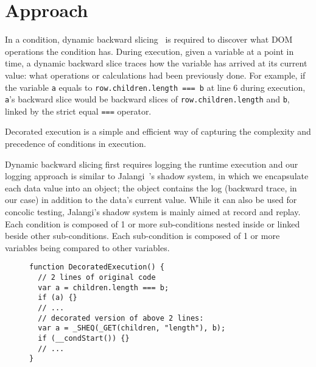 \section{Approach}

In a condition, dynamic backward slicing~\cite{} is required to discover what DOM operations the condition has.  
During execution, given a variable at a point in time, a dynamic backward slice traces how the variable has arrived at its current value: what operations or calculations had been previously done.  
For example, if the variable {\tt a} equals to {\tt row.children.length === b} at line 6 during execution, {\tt a}'s backward slice would be backward slices of {\tt row.children.length} and {\tt b}, linked by the strict equal {\tt ===} operator.  

Decorated execution is a simple and efficient way of capturing the complexity and precedence of conditions in execution.  

Dynamic backward slicing first requires logging the runtime execution and our logging approach is similar to Jalangi~\cite{jalangi}'s shadow system, in which we encapsulate each data value into an object; the object contains the log (backward trace, in our case) in addition to the data’s current value. While it can also be used for concolic testing, Jalangi’s shadow system is mainly aimed at record and replay.  
Each condition is composed of 1 or more sub-conditions nested inside or linked beside other sub-conditions.  Each sub-condition is composed of 1 or more variables being compared to other variables.  

\begin{figure}
\begin{lstlisting}[caption=Example showing how code is decorated for logging execution and using the trace to construct a dynamic backward slice,label=decorated]  
function DecoratedExecution() {
  // 2 lines of original code
  var a = children.length === b; 
  if (a) {}
  // ...
  // decorated version of above 2 lines:
  var a = _SHEQ(_GET(children, "length"), b);
  if (__condStart()) {}
  // ...
}
\end{lstlisting}
\end{figure}













